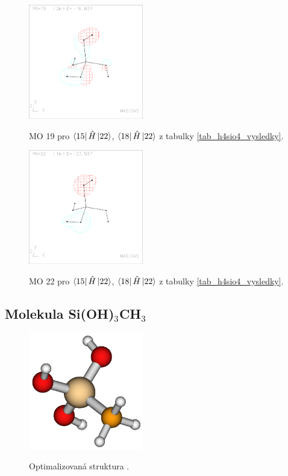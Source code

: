 \documentclass[
  digital, %
  table,   %
  lof,     %
  lot,     %
]{fithesis3}
\begin{document}
\begin{figure}[h]
\caption{MO 19 pro $\bra{15}{\hat{H}}\ket{22}$, $\bra{18}{\hat{H}}\ket{22}$ z tabulky \ref{tab_h4sio4_vysledky}.  }
  \center
  \includegraphics[width=5cm]{h4sio4_obrazky/s3__19.eps}
  \label{obr_h4sio4_MO_s3_19}
  \end{figure}

\begin{figure}[h]
\caption{MO 22 pro $\bra{15}{\hat{H}}\ket{22}$, $\bra{18}{\hat{H}}\ket{22}$ z tabulky \ref{tab_h4sio4_vysledky}.  }
  \center
  \includegraphics[width=5cm]{h4sio4_obrazky/s3__22.eps}
  \label{obr_h4sio4_MO_s3_22}
  \end{figure}
  
\subsection{Molekula Si(OH)$_3$CH$_3$}
\begin{figure}[h!]
\caption{Optimalizovaná struktura . }
  \center
  \includegraphics[width=5cm]{si(oh)3ch3_obr.png}
  \label{obr_sioh3ch3_opt_struktura}
  \end{figure}
  
\end{document}

